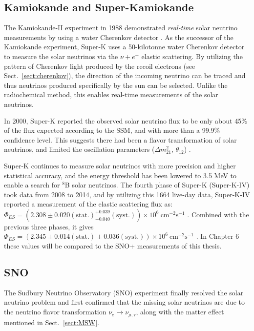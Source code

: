 \subsection{Kamiokande and Super-Kamiokande}\label{sect:superKsolarnu}
The Kamiokande-II experiment in 1988 demonstrated \emph{real-time} solar neutrino measurements by using a water Cherenkov detector \cite{superKwebsite}. As the successor of the Kamiokande experiment, Super-K uses a 50-kilotonne water Cherenkov detector to measure the solar neutrinos via the $\nu+e^-$ elastic scattering. By utilizing the pattern of Cherenkov light produced by the recoil electrons (see Sect.~\ref{sect:cherenkov}), the direction of the incoming neutrino can be traced and thus neutrinos produced specifically by the sun can be selected. Unlike the radiochemical method, this enables real-time measurements of the solar neutrinos.

In 2000, Super-K reported the observed solar neutrino flux to be only about 45\% of the flux expected according to the SSM, and with more than a 99.9\% confidence level. This suggests there had been a flavor transformation of solar neutrinos, and limited the oscillation parameters ($\Delta m^2_{21}$, $\theta_{12}$) \cite{superKwebsite}. 

Super-K continues to measure solar neutrinos with more precision and higher statistical accuracy, and the energy threshold has been lowered to 3.5 MeV to enable a search for $^8$B solar neutrinos. The fourth phase of Super-K (Super-K-IV) took data from 2008 to 2014, and by utilizing this 1664 live-day data, Super-K-IV reported a measurement of the elastic scattering flux as: $\Phi_{ES}=(2.308\pm0.020\mathrm{(stat.)}^{+0.039}_{-0.040}\mathrm{(syst.)})\times 10^6~\mathrm{cm^{-2}s^{-1}}$ \cite{abe2016solar}. Combined with the previous three phases, it gives $\Phi_{ES}=(2.345\pm0.014\mathrm{(stat.)}\pm 0.036\mathrm{(syst.)})\times 10^6~\mathrm{cm^{-2}s^{-1}}$ \cite{abe2016solar}. In Chapter 6 these values will be compared to the SNO+ measurements of this thesis.

\subsection{SNO}

The Sudbury Neutrino Observatory (SNO) experiment finally resolved the solar neutrino problem and first confirmed that the missing solar neutrinos are due to the neutrino flavor transformation $\nu_e\to\nu_{\mu,\tau}$, along with the matter effect mentioned in Sect.~\ref{sect:MSW}. 

